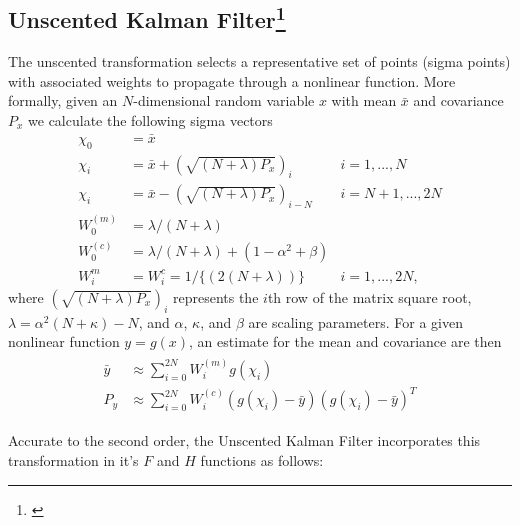 \begin{appendices}
\chapter{Unscented Kalman Filter\footnote{\citet{Wan00theunscented}}}\label{sec:ukf}
The unscented transformation selects a representative set of points (sigma points) with associated weights to propagate through a nonlinear function. More formally, given an $N$-dimensional random variable $x$ with mean $\bar{x}$ and covariance $P_x$ we calculate the following sigma vectors 
\begin{equation}\label{eq:unscentedtransform}
\begin{aligned}
  \chi_0 &= \bar{x}\\
  \chi_i &= \bar{x} + (\sqrt{(N + \lambda)P_x})_i & i = 1, ..., N \\
  \chi_i &= \bar{x} - (\sqrt{(N + \lambda)P_x})_{i-N} & i = N + 1, ..., 2N\\
  W_0^{(m)} &= \lambda /(N + \lambda) \\
  W_0^{(c)} &= \lambda /(N + \lambda) + (1- \alpha^2 + \beta)\\
  W_i^m &= W_i^c = 1/\{(2(N + \lambda))\} & i = 1, ..., 2N,
\end{aligned}
\end{equation}
where $(\sqrt{(N + \lambda)P_x})_i$ represents the $i$th row of the matrix square root, $\lambda = \alpha^2(N + \kappa) - N$, and $\alpha$, $\kappa$, and $\beta$ are scaling parameters. For a given nonlinear function $y=g(x)$, an estimate for the mean and covariance are then
\begin{align}
\begin{split}
  \bar{y} &\approx \sum_{i=0}^{2N} W_i^{(m)}g(\chi_i)\\
  P_y &\approx \sum_{i=0}^{2N} W_i^{(c)}(g(\chi_i) - \bar{y})(g(\chi_i) - \bar{y})^T
\end{split}
\end{align}

Accurate to the second order, the Unscented Kalman Filter incorporates this transformation in it's $F$ and $H$ functions as follows:


\end{appendices}
